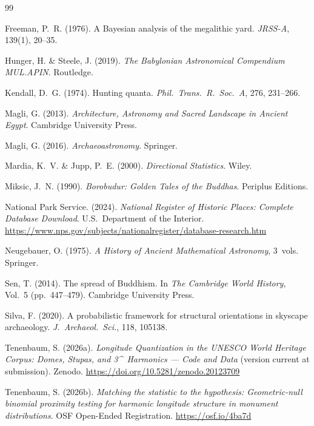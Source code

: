 \documentclass[12pt,a4paper]{article}
\newcommand{\degr}{\ifmmode^\circ\else\textdegree{}\fi}
\begin{document}
\begin{thebibliography}{99}

Freeman, P.~R. (1976). A Bayesian analysis of the megalithic yard.
\textit{JRSS-A}, 139(1), 20--35.

Hunger, H. \& Steele, J. (2019).
\textit{The Babylonian Astronomical Compendium MUL.APIN}. Routledge.

Kendall, D.~G. (1974). Hunting quanta.
\textit{Phil.\ Trans.\ R.\ Soc.\ A}, 276, 231--266.

Magli, G. (2013). \textit{Architecture, Astronomy and Sacred Landscape
in Ancient Egypt}. Cambridge University Press.

Magli, G. (2016). \textit{Archaeoastronomy}. Springer.

Mardia, K.~V. \& Jupp, P.~E. (2000). \textit{Directional Statistics}.
Wiley.

Miksic, J.~N. (1990). \textit{Borobudur: Golden Tales of the Buddhas}.
Periplus Editions.

{National Park Service}. (2024). \textit{National Register of Historic
Places: Complete Database Download}. U.S.\ Department of the Interior.
\url{https://www.nps.gov/subjects/nationalregister/database-research.htm}

Neugebauer, O. (1975). \textit{A History of Ancient Mathematical
Astronomy}, 3~vols. Springer.

Sen, T. (2014). The spread of Buddhism. In \textit{The Cambridge World
History}, Vol.~5 (pp.~447--479). Cambridge University Press.

Silva, F. (2020). A probabilistic framework for structural orientations
in skyscape archaeology. \textit{J.\ Archaeol.\ Sci.}, 118, 105138.

Tenenbaum, S. (2026a). \textit{Longitude Quantization in the UNESCO
World Heritage Corpus: Domes, Stupas, and 3\degr\ Harmonics --- Code
and Data} (version current at submission). Zenodo.
\url{https://doi.org/10.5281/zenodo.20123709}

Tenenbaum, S. (2026b). \textit{Matching the statistic to the hypothesis:
Geometric-null binomial proximity testing for harmonic longitude
structure in monument distributions}. OSF Open-Ended Registration.
\url{https://osf.io/4ba7d}


\end{thebibliography}
\end{document}
